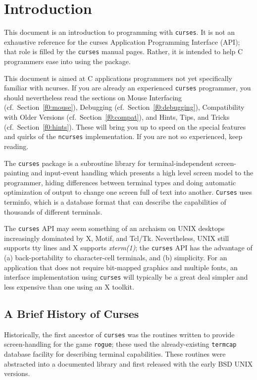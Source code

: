 \chapter{Introduction}

\label{f0:introduction}This document is an introduction to programming with \texttt{curses}. It is
not an exhaustive reference for the curses Application Programming Interface
(API); that role is filled by the \texttt{curses} manual pages.  Rather, it
is intended to help C programmers ease into using the package. 

This document is aimed at C applications programmers not yet specifically
familiar with ncurses.  If you are already an experienced \texttt{curses}
programmer, you should nevertheless read the sections on
Mouse Interfacing (cf.\ Section~\ref{f0:mouse}), Debugging (cf.\ Section~\ref{f0:debugging}),
Compatibility with Older Versions (cf.\ Section~\ref{f0:compat}),
and Hints, Tips, and Tricks (cf.\ Section~\ref{f0:hints}).  These will bring you up
to speed on the special features and quirks of the \texttt{ncurses}
implementation.  If you are not so experienced, keep reading. 

The \texttt{curses} package is a subroutine library for
terminal-independent screen-painting and input-event handling which
presents a high level screen model to the programmer, hiding differences
between terminal types and doing automatic optimization of output to change
one screen full of text into another.  \texttt{Curses} uses terminfo, which
is a database format that can describe the capabilities of thousands of
different terminals. 

The \texttt{curses} API may seem something of an archaism on UNIX desktops
increasingly dominated by X, Motif, and Tcl/Tk.  Nevertheless, UNIX still
supports tty lines and X supports \emph{xterm(1)}; the \texttt{curses}
API has the advantage of (a) back-portability to character-cell terminals,
and (b) simplicity.  For an application that does not require bit-mapped
graphics and multiple fonts, an interface implementation using \texttt{curses}
will typically be a great deal simpler and less expensive than one using an
X toolkit.

\section{A Brief History of Curses}

\label{f0:history}Historically, the first ancestor of \texttt{curses} was the routines written to
provide screen-handling for the game \texttt{rogue}; these used the
already-existing \texttt{termcap} database facility for describing terminal
capabilities.  These routines were abstracted into a documented library and
first released with the early BSD UNIX versions. 

